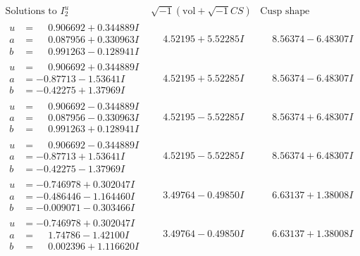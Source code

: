 \documentclass[1p]{elsarticle_modified}
\theoremstyle{definition}
\newcommand{\I}{\sqrt{-1}}
\begin{document}
$$\begin{array}{c|c|c}  
\text{Solutions to }I^u_{2}& \I (\text{vol} + \sqrt{-1}CS) & \text{Cusp shape}\\
 \hline 
\begin{aligned}
u &= \phantom{-}0.906692 + 0.344889 I \\
a &= \phantom{-}0.087956 + 0.330963 I \\
b &= \phantom{-}0.991263 - 0.128941 I\end{aligned}
 & \phantom{-}4.52195 + 5.52285 I & \phantom{-}8.56374 - 6.48307 I \\ \hline\begin{aligned}
u &= \phantom{-}0.906692 + 0.344889 I \\
a &= -0.87713 - 1.53641 I \\
b &= -0.42275 + 1.37969 I\end{aligned}
 & \phantom{-}4.52195 + 5.52285 I & \phantom{-}8.56374 - 6.48307 I \\ \hline\begin{aligned}
u &= \phantom{-}0.906692 - 0.344889 I \\
a &= \phantom{-}0.087956 - 0.330963 I \\
b &= \phantom{-}0.991263 + 0.128941 I\end{aligned}
 & \phantom{-}4.52195 - 5.52285 I & \phantom{-}8.56374 + 6.48307 I \\ \hline\begin{aligned}
u &= \phantom{-}0.906692 - 0.344889 I \\
a &= -0.87713 + 1.53641 I \\
b &= -0.42275 - 1.37969 I\end{aligned}
 & \phantom{-}4.52195 - 5.52285 I & \phantom{-}8.56374 + 6.48307 I \\ \hline\begin{aligned}
u &= -0.746978 + 0.302047 I \\
a &= -0.486446 - 1.164460 I \\
b &= -0.009071 - 0.303466 I\end{aligned}
 & \phantom{-}3.49764 - 0.49850 I & \phantom{-}6.63137 + 1.38008 I \\ \hline\begin{aligned}
u &= -0.746978 + 0.302047 I \\
a &= \phantom{-}1.74786 - 1.42100 I \\
b &= \phantom{-}0.002396 + 1.116620 I\end{aligned}
 & \phantom{-}3.49764 - 0.49850 I & \phantom{-}6.63137 + 1.38008 I \\ \hline\begin{aligned}

\end{aligned}
\end{array}$$
\end{document}
